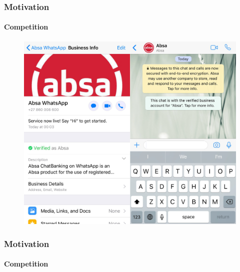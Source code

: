 \documentclass[11pt]{beamer}
\begin{document}
\begin{frame}
	\frametitle{Motivation}
	\framesubtitle{Competition}
	\begin{figure}[h]
		\centering
		\includegraphics[scale=.15]{images/Absa-Whatsapp}
		\label{Absa-Whatsapp}
	\end{figure}
\end{frame}

\begin{frame}
	\frametitle{Motivation}
	\framesubtitle{Competition}
	\begin{figure}
		\centering
		\qquad
	\end{figure}

\end{frame}
\end{document}
